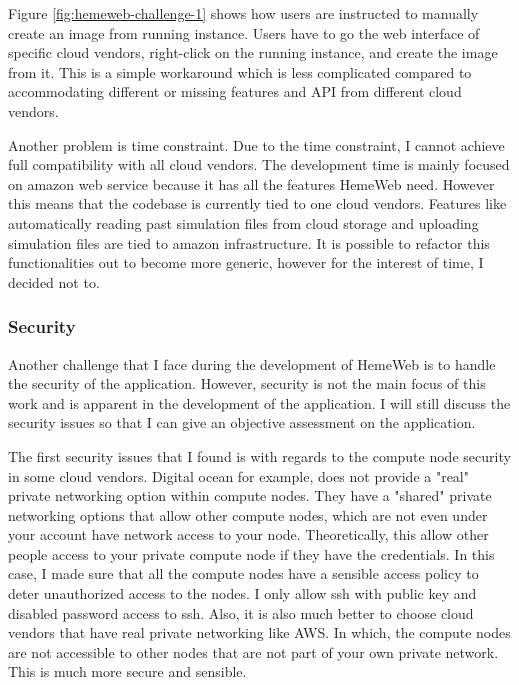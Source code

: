 \vspace{1cm}

Figure \ref{fig:hemeweb-challenge-1} shows how users are instructed to manually create an image from running instance. Users have to go the web interface of specific cloud vendors, right-click on the running instance, and create the image from it. This is a simple workaround which is less complicated compared to accommodating different or missing features and API from different cloud vendors.


Another problem is time constraint. Due to the time constraint, I cannot achieve full compatibility with all cloud vendors. The development time is mainly focused on amazon web service because it has all the features HemeWeb need. However this means that the codebase is currently tied to one cloud vendors. Features like automatically reading past simulation files from cloud storage and uploading simulation files are tied to amazon infrastructure. It is possible to refactor this functionalities out to become more generic, however for the interest of time, I decided not to.

\subsubsection{Security}

Another challenge that I face during the development of HemeWeb is to handle the security of the application. However, security is not the main focus of this work and is apparent in the development of the application. I will still discuss the security issues so that I can give an objective assessment on the application.

The first security issues that I found is with regards to the compute node security in some cloud vendors. Digital ocean for example, does not provide a "real" private networking option within compute nodes. They have a "shared" private networking options that allow other compute nodes, which are not even under your account have network access to your node. Theoretically, this allow other people access to your private compute node if they have the credentials. In this case, I made sure that all the compute nodes have a sensible access policy to deter unauthorized access to the nodes. I only allow ssh with public key and disabled password access to ssh. Also, it is also much better to choose cloud vendors that have real private networking like AWS. In which, the compute nodes are not accessible to other nodes that are not part of your own private network. This is much more secure and sensible.


